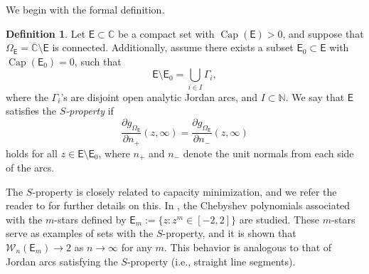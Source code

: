 \documentclass[12pt,oneside,reqno]{amsart}
\theoremstyle{definition}
\newtheorem{definition}[theorem]{Definition}
\numberwithin{equation}{section}
\newcommand{\N}{{\mathbb N}}
\newcommand{\C}{{\mathbb C}}
\newcommand{\E}{{\mathsf E}}
\newcommand{\cW}{{\mathcal{W}}}
\newcommand{\RS}{\overline{\C}}
\renewcommand{\Cap}{\operatorname{Cap}}
\begin{document}
We begin with the formal definition.
\begin{definition}%
\label{def:s-property}
    Let $\E\subset \C$ be a compact set with $\Cap(\E)>0$, and suppose that $\Omega_\E=\RS\setminus \E$ is connected. Additionally, assume there exists a subset $\E_0\subset \E$ with $\Cap(\E_0) = 0$, such that
    \begin{equation}
    	\E\setminus \E_0 = \bigcup_{i\in I}\Gamma_i,
    \end{equation}
    where the $\Gamma_i$'s are disjoint open analytic Jordan arcs, and $I\subset \N$. We say that $\E$ satisfies the \emph{$S$-property} if
    \begin{equation}
		\frac{\partial g_{\Omega_\E}}{\partial n_+}(z,\infty)=\frac{\partial g_{\Omega_\E}}{\partial n_-}(z,\infty)
		\label{eq:s-property}
	\end{equation}
    holds for all $z\in \E\setminus \E_0$, where $n_+$ and $n_-$ denote the unit normals from each side of the arcs.
\end{definition}

The \(S\)-property is closely related to capacity minimization, and we refer the reader to \cite{stahl85-1,stahl85-2,stahl12} for further details on this. In \cite{christiansen-eichinger-rubin23}, the Chebyshev polynomials associated with the $m$-stars defined by $\E_m:=\{z:z^m\in [-2,2]\}$ are studied. These $m$-stars serve as examples of sets with the $S$-property, and it is shown that $\cW_n(\E_m)\rightarrow 2$ as $n\rightarrow \infty$ for any $m$. This behavior is analogous to that of Jordan arcs satisfying the $S$-property (i.e., straight line segments).
\end{document}
